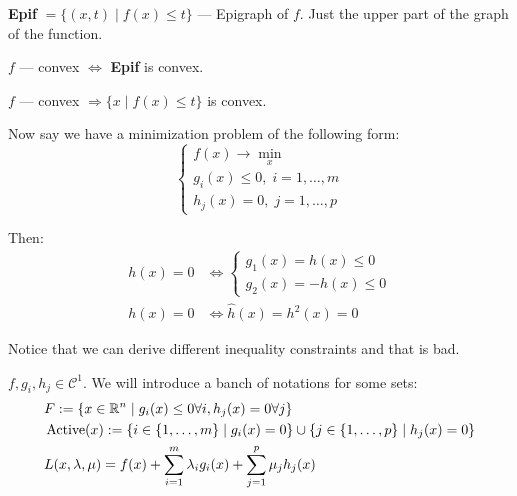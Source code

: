 \begin{conj}
    \textbf{Epif} $ = \{(x, t) \mid f(x) \leq t\}$ --- Epigraph of $f$. Just the upper part of the graph of the function.
\end{conj}

\begin{theorem}
    $f$ --- convex $\Longleftrightarrow$ \textbf{Epif} is convex.
\end{theorem}

\begin{theorem}
    $f$ --- convex $\Longrightarrow \{ x \mid f(x) \leq t \}$ is convex.
\end{theorem}

Now say we have a minimization problem of the following form:
\[ 
    \begin{cases}
        f(x) \to \min_x \\ 
        g_i(x) \leq 0, \; i = 1, \ldots, m \\ 
        h_j (x) = 0, \; j = 1, \ldots, p
    \end{cases}
\]

Then: 
\begin{align*}
    h(x) = 0 &\Longleftrightarrow \begin{cases}
        g_1 (x) = h(x) \leq 0 \\
        g_2 (x) = -h(x) \leq 0
    \end{cases} \\ 
    h(x) = 0 &\Longleftrightarrow \hat{h}(x) = h^2 (x) = 0
\end{align*}

Notice that we can derive different inequality constraints and that is bad. 

\begin{conj}
    $f, g_i, h_j \in \mathcal{C}^1$. We will introduce a banch of notations for some sets: 
    \begin{align*}
        &F := \{ x \in \mathbb{R}^n \mid g_i(x) \leq 0 \forall i, h_j(x) = 0 \forall j \} \\
        &\operatorname{Active}(x) := \{ i \in \{1, \ldots, m\} \mid g_i(x) = 0 \} \cup \{ j \in \{1, \ldots, p\} \mid h_j(x) = 0 \} \\
        &L(x, \lambda, \mu) = f(x) + \sum_{i=1}^m \lambda_i g_i(x) + \sum_{j=1}^p \mu_j h_j(x)
    \end{align*}
\end{conj}

